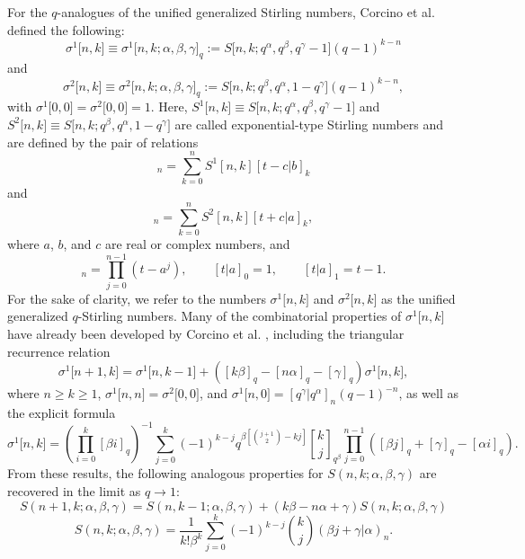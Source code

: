 \documentclass[12pt]{article}
\newcommand{\rstf}[2]{\genfrac{[}{]}{0pt}{0}{#1}{#2}}
\begin{document}
For the $q$-analogues of the unified generalized Stirling numbers, Corcino et al. \cite{Corcino4} defined the following:
\begin{equation}
	\sigma^1\big[n,k\big]\equiv\sigma^1\big[n,k;\alpha,\beta,\gamma\big]_q:=S\big[n,k;q^\alpha,q^\beta,q^\gamma-1\big](q-1)^{k-n}
	\label{corq1}
\end{equation}
and
\begin{equation}
	\sigma^2\big[n,k\big]\equiv\sigma^2\big[n,k;\alpha,\beta,\gamma\big]_q:=S\big[n,k;q^\beta,q^\alpha,1-q^\gamma\big](q-1)^{k-n},
\end{equation}
with $\sigma^1\big[0,0\big]=\sigma^2\big[0,0\big]=1$. Here, $S^1\big[n,k\big]\equiv S\big[n,k;q^\alpha,q^\beta,q^\gamma-1\big]$ and $S^2\big[n,k\big]\equiv S\big[n,k;q^\beta,q^\alpha,1-q^\gamma\big]$ are called exponential-type Stirling numbers and are defined by the pair of relations \cite[equations (3) and (4)]{Corcino4}
\begin{equation}
	[t|a]_n=\sum_{k=0}^{n}S^1[n,k][t-c|b]_k \label{etS1}
\end{equation}
and
\begin{equation}
	[t|b]_n=\sum_{k=0}^{n}S^2[n,k][t+c|a]_k,\label{etS2}
\end{equation}
where $a$, $b$, and $c$ are real or complex numbers, and
\begin{equation*}
	[t|a]_n=\prod_{j=0}^{n-1}(t-a^j),\qquad
	[t|a]_0=1,\qquad
	[t|a]_1=t-1.
\end{equation*}
For the sake of clarity, we refer to the numbers $\sigma^1\big[n,k\big]$ and $\sigma^2\big[n,k\big]$ as the unified generalized $q$-Stirling numbers. Many of the combinatorial properties of $\sigma^1\big[n,k\big]$ have already been developed by Corcino et al. \cite{Corcino3,Corcino4}, including the triangular recurrence relation
\begin{equation}\label{recqgenstir}
	\sigma^1\big[n+1,k\big]=\sigma^1\big[n,k-1\big]+([k\beta]_q-[n\alpha]_q-[\gamma]_q)\sigma^1\big[n,k\big],
\end{equation}
where $n\geq k\geq1$, $\sigma^1\big[n,n\big]=\sigma^2\big[0,0\big]$, and $\sigma^1\big[n,0\big]=[q^{\gamma}|q^{\alpha}]_n(q-1)^{-n}$, as well as the explicit formula
\begin{equation}
	\sigma^1\big[n,k\big]=\left(\prod_{i=0}^{k}[\beta i]_q\right)^{-1}\sum_{j=0}^{k}(-1)^{k-j}q^{\beta\left[\binom{j+1}{2}-kj\right]}\rstf{k}{j}_{q^{\beta}}\prod_{j=0}^{n-1}\left([\beta j]_q+[\gamma]_q-[\alpha i]_q\right).
\end{equation}
From these results, the following analogous properties for $S(n,k;\alpha,\beta,\gamma)$ are recovered in the limit as $q\rightarrow1$:
\begin{equation}
S(n+1,k;\alpha,\beta,\gamma)=S(n,k-1;\alpha,\beta,\gamma)+(k\beta-n\alpha+\gamma)S(n,k;\alpha,\beta,\gamma)\label{unirecur}
\end{equation}
\begin{equation}
	S(n,k;\alpha,\beta,\gamma)=\frac{1}{k!\beta^k}\sum_{j=0}^{k}(-1)^{k-j}\binom{k}{j}(\beta j+\gamma|\alpha)_n.
\end{equation}
\end{document}
